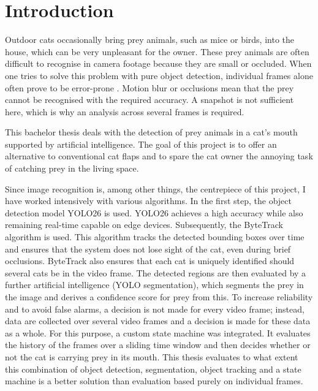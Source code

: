 \chapter{Introduction}
\label{sec:einleitung}

Outdoor cats occasionally bring prey animals, such as mice or birds, into the house, which can be very unpleasant for the owner. These prey animals are often difficult to recognise in camera footage because they are small or occluded. When one tries to solve this problem with pure object detection, individual frames alone often prove to be error-prone \cite{jiao2022video}. Motion blur or occlusions mean that the prey cannot be recognised with the required accuracy. A snapshot is not sufficient here, which is why an analysis across several frames is required.

This bachelor thesis deals with the detection of prey animals in a cat's mouth supported by artificial intelligence. The goal of this project is to offer an alternative to conventional cat flaps and to spare the cat owner the annoying task of catching prey in the living space.

Since image recognition is, among other things, the centrepiece of this project, I have worked intensively with various algorithms. In the first step, the object detection model YOLO26 \cite{jocher2024yolo} is used. YOLO26 achieves a high accuracy while also remaining real-time capable on edge devices. Subsequently, the ByteTrack \cite{zhang2022bytetrack} algorithm is used. This algorithm tracks the detected bounding boxes over time and ensures that the system does not lose sight of the cat, even during brief occlusions. ByteTrack also ensures that each cat is uniquely identified should several cats be in the video frame. The detected regions are then evaluated by a further artificial intelligence (YOLO segmentation), which segments the prey in the image and derives a confidence score for prey from this. To increase reliability and to avoid false alarms, a decision is not made for every video frame; instead, data are collected over several video frames and a decision is made for these data as a whole. For this purpose, a custom state machine was integrated. It evaluates the history of the frames over a sliding time window and then decides whether or not the cat is carrying prey in its mouth. This thesis evaluates to what extent this combination of object detection, segmentation, object tracking and a state machine is a better solution than evaluation based purely on individual frames.
